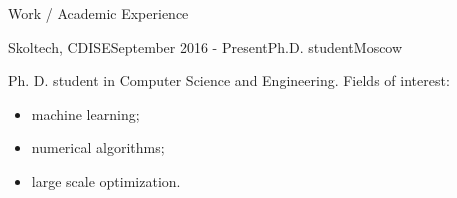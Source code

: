 \documentclass{resume} %
\begin{document}
\begin{rSection}{Work / Academic Experience}

\begin{rSubsection}{Skoltech, CDISE}{September 2016 - Present}{Ph.D. student}{Moscow}
    \item Ph. D. student in Computer Science and Engineering. Fields of interest: \begin{itemize}
        \item machine learning;
        \item numerical algorithms;
        \item large scale optimization.
    \end{itemize}
\end{rSubsection} \medskip



\end{rSection}
\end{document}
